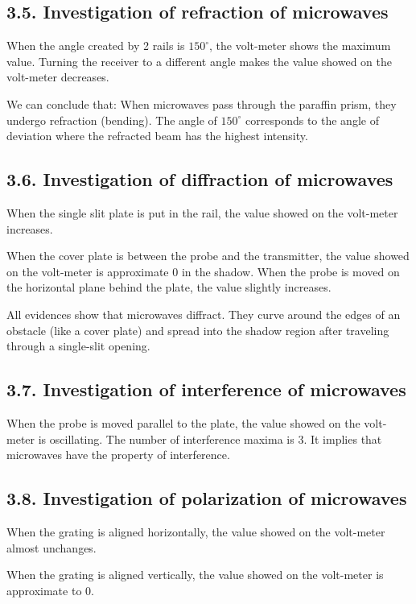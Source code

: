 \documentclass[12pt,oneside,a4paper]{article}
\theoremstyle{definition}
\begin{document}
	
	\subsection*{3.5. Investigation of refraction of microwaves}
	\noindent
	When the angle created by 2 rails is $150^\circ$, the volt-meter shows the maximum value. Turning the receiver to a different angle makes the value showed on the volt-meter decreases.
	
	\noindent
	We can conclude that: When microwaves pass through the paraffin prism, they undergo refraction (bending). The angle of $150^\circ$ corresponds to the angle of deviation where the refracted beam has the highest intensity.
	
	\subsection*{3.6. Investigation of diffraction of microwaves}
	\noindent
	When the single slit plate is put in the rail, the value showed on the volt-meter increases.
	
	\noindent
	When the cover plate is between the probe and the transmitter, the value showed on the volt-meter is approximate 0 in the shadow. When the probe is moved on the horizontal plane behind the plate, the value slightly increases.
	
	\noindent
	All evidences show that microwaves diffract. They curve around the edges of an obstacle (like a cover plate) and spread into the shadow region after traveling through a single-slit opening.
	
	\subsection*{3.7. Investigation of interference of microwaves}
	\noindent
	When the probe is moved parallel to the plate, the value showed on the volt-meter is oscillating. The number of interference maxima is 3. It implies that microwaves have the property of interference.
	
	\subsection*{3.8. Investigation of polarization of microwaves}
	\noindent
	When the grating is aligned horizontally, the value showed on the volt-meter almost unchanges.
	
	\noindent
	When the grating is aligned vertically, the value showed on the volt-meter is approximate to $0$.
	
\end{document}
